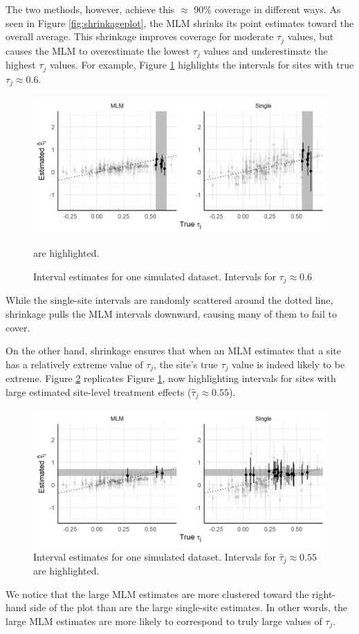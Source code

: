 \documentclass[]{article}
\begin{document}
The two methods, however, achieve this $\approx$ 90\% coverage in different ways.
As seen in Figure \ref{fig:shrinkageplot}, the MLM shrinks its point estimates toward the overall average.
This shrinkage improves coverage for moderate $\tau_j$ values, but causes the MLM to overestimate the lowest $\tau_j$ values and underestimate the highest $\tau_j$ values.
For example, Figure \ref{fig:shrinkageplot_slice1} highlights the intervals for sites with true $\tau_j \approx 0.6$.
\begin{figure}[ht]
	\centering
	\includegraphics[width=\textwidth]{shrinkageplot_slice1}
	\caption{Interval estimates for one simulated dataset. Intervals for $\tau_j \approx 0.6$} are highlighted.
	\label{fig:shrinkageplot_slice1}
\end{figure}
While the single-site intervals are randomly scattered around the dotted line, shrinkage pulls the MLM intervals downward, causing many of them to fail to cover.

On the other hand, shrinkage ensures that when an MLM estimates that a site has a relatively extreme value of $\tau_j$, the site's true $\tau_j$ value is indeed likely to be extreme.
Figure \ref{fig:shrinkageplot_slice3} replicates Figure \ref{fig:shrinkageplot_slice1}, now highlighting intervals for sites with large estimated site-level treatment effects ($\hat{\tau}_j \approx 0.55$).
\begin{figure}[h]
	\centering
	\includegraphics[width=\textwidth]{shrinkageplot_slice3}
	\caption{Interval estimates for one simulated dataset. Intervals for $\hat{\tau}_j \approx 0.55$ are highlighted.}
	\label{fig:shrinkageplot_slice3}
\end{figure}
We notice that the large MLM estimates are more clustered toward the right-hand side of the plot than are the large single-site estimates.
In other words, the large MLM estimates are more likely to correspond to truly large values of $\tau_j$.
\end{document}
